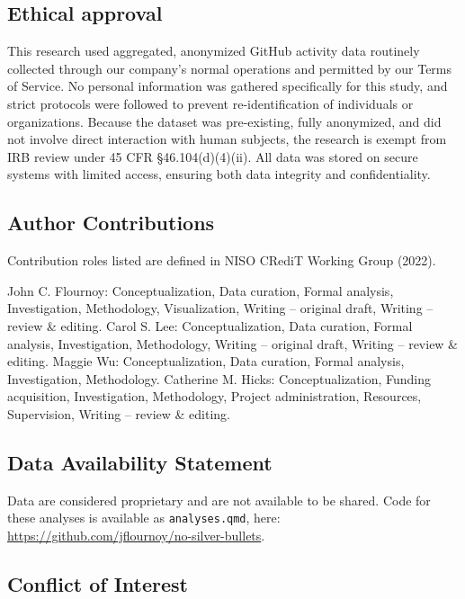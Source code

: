 \documentclass[
]{article}
\begin{document}
\subsection{Ethical approval}\label{ethical-approval}

This research used aggregated, anonymized GitHub activity data routinely
collected through our company's normal operations and permitted by our
Terms of Service. No personal information was gathered specifically for
this study, and strict protocols were followed to prevent
re-identification of individuals or organizations. Because the dataset
was pre-existing, fully anonymized, and did not involve direct
interaction with human subjects, the research is exempt from IRB review
under 45 CFR \S 46.104(d)(4)(ii). All data was stored on secure systems
with limited access, ensuring both data integrity and confidentiality.

\subsection{Author Contributions}\label{author-contributions}

Contribution roles listed are defined in NISO CRediT Working Group
(2022).

John C. Flournoy: Conceptualization, Data curation, Formal analysis,
Investigation, Methodology, Visualization, Writing -- original draft,
Writing -- review \& editing. Carol S. Lee: Conceptualization, Data
curation, Formal analysis, Investigation, Methodology, Writing --
original draft, Writing -- review \& editing. Maggie Wu:
Conceptualization, Data curation, Formal analysis, Investigation,
Methodology. Catherine M. Hicks: Conceptualization, Funding acquisition,
Investigation, Methodology, Project administration, Resources,
Supervision, Writing -- review \& editing.

\subsection{Data Availability
Statement}\label{data-availability-statement}

Data are considered proprietary and are not available to be shared. Code
for these analyses is available as \texttt{analyses.qmd}, here:
\url{https://github.com/jflournoy/no-silver-bullets}.

\subsection{Conflict of Interest}\label{conflict-of-interest}
\end{document}
